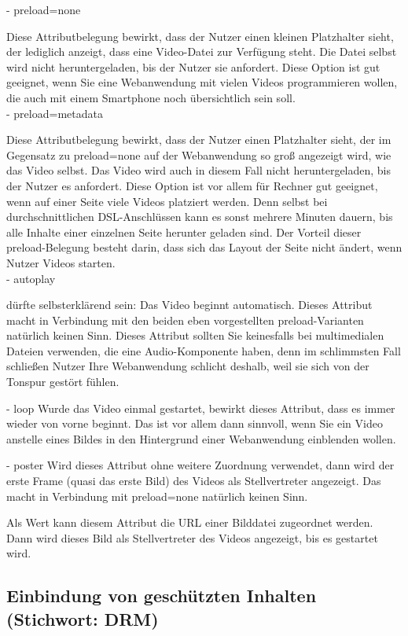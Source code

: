 -	preload=none

Diese Attributbelegung bewirkt, dass der Nutzer einen kleinen Platzhalter sieht, der lediglich anzeigt, dass eine Video-Datei zur Verfügung steht. Die Datei selbst wird nicht heruntergeladen, bis der Nutzer sie anfordert. Diese Option ist gut geeignet, wenn Sie eine Webanwendung mit vielen Videos programmieren wollen, die auch mit einem Smartphone noch übersichtlich sein soll.\\

-	preload=metadata

Diese Attributbelegung bewirkt, dass der Nutzer einen Platzhalter sieht, der im Gegensatz zu preload=none auf der Webanwendung so groß angezeigt wird, wie das Video selbst. Das Video wird auch in diesem Fall nicht heruntergeladen, bis der Nutzer es anfordert. Diese Option ist vor allem für Rechner gut geeignet, wenn auf einer Seite viele Videos platziert werden. Denn selbst bei durchschnittlichen DSL-Anschlüssen kann es sonst mehrere Minuten dauern, bis alle Inhalte einer einzelnen Seite herunter geladen sind. Der Vorteil dieser preload-Belegung besteht darin, dass sich das Layout der Seite nicht ändert, wenn Nutzer Videos starten.\\

-	autoplay

dürfte selbsterklärend sein: Das Video beginnt automatisch. Dieses Attribut macht in Verbindung mit den beiden eben vorgestellten preload-Varianten natürlich keinen Sinn. Dieses Attribut sollten Sie keinesfalls bei multimedialen Dateien verwenden, die eine Audio-Komponente haben, denn im schlimmsten Fall schließen Nutzer Ihre Webanwendung schlicht deshalb, weil sie sich von der Tonspur gestört fühlen.

-	loop
Wurde das Video einmal gestartet, bewirkt dieses Attribut, dass es immer wieder von vorne beginnt. Das ist vor allem dann sinnvoll, wenn Sie ein Video anstelle eines Bildes in den Hintergrund einer Webanwendung einblenden wollen. 

-	poster
Wird dieses Attribut ohne weitere Zuordnung verwendet, dann wird der erste Frame (quasi das erste Bild) des Videos als Stellvertreter angezeigt. Das macht in Verbindung mit preload=none natürlich keinen Sinn.

Als Wert kann diesem Attribut die URL einer Bilddatei zugeordnet werden. Dann wird dieses Bild als Stellvertreter des Videos angezeigt, bis es gestartet wird.

\subsection{Einbindung von geschützten Inhalten (Stichwort: DRM)}

